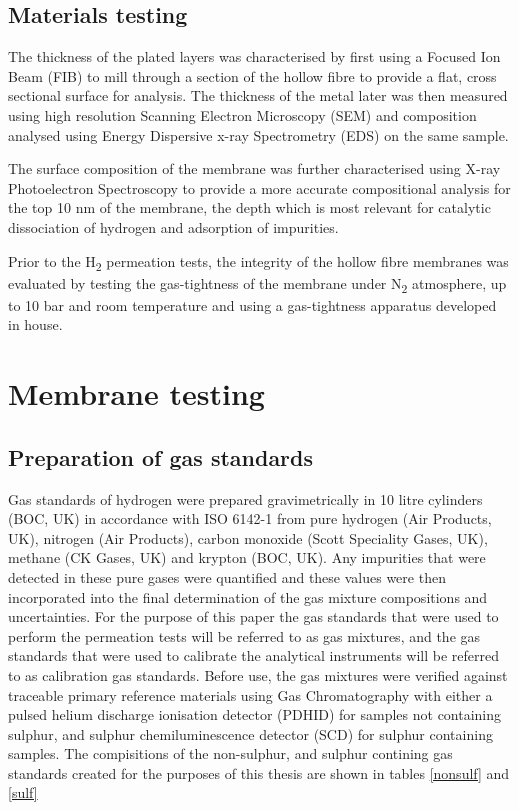\subsection{Materials testing}\label{MatTest}
The thickness of the plated layers was characterised by first using a Focused Ion Beam (FIB) to mill through a section of the hollow fibre to provide a flat, cross sectional surface for analysis. The thickness of the metal later was then measured using high resolution Scanning Electron Microscopy (SEM) and composition analysed using Energy Dispersive x-ray Spectrometry (EDS) on the same sample. 

The surface composition of the membrane was further characterised using X-ray Photoelectron Spectroscopy to provide a more accurate compositional analysis for the top 10 nm of the membrane, the depth which is most relevant for catalytic dissociation of hydrogen and adsorption of impurities.

Prior to the H\textsubscript{2} permeation tests, the integrity of the hollow fibre membranes was evaluated by testing the gas-tightness of the membrane under N\textsubscript{2} atmosphere, up to 10 bar and room temperature and using a gas-tightness apparatus developed in house. \cite{GouveiaGil2015}

\section{Membrane testing}
\subsection{Preparation of gas standards}
Gas standards of hydrogen were prepared gravimetrically in 10 litre cylinders (BOC, UK) in accordance with ISO 6142-1 from pure hydrogen (Air Products, UK), nitrogen (Air Products), carbon monoxide (Scott Speciality Gases, UK), methane (CK Gases, UK) and krypton (BOC, UK). Any impurities that were detected in these pure gases were quantified and these values were then incorporated into the final determination of the gas mixture compositions and uncertainties. For the purpose of this paper the gas standards that were used to perform the permeation tests will be referred to as gas mixtures, and the gas standards that were used to calibrate the analytical instruments will be referred to as calibration gas standards. Before use, the gas mixtures were verified against traceable primary reference materials using Gas Chromatography with either a pulsed helium discharge ionisation detector (PDHID) for samples not containing sulphur, and sulphur chemiluminescence detector (SCD) for sulphur containing samples. The compisitions of the non-sulphur, and sulphur contining gas standards created for the purposes of this thesis are shown in tables \ref{nonsulf} and \ref{sulf}

